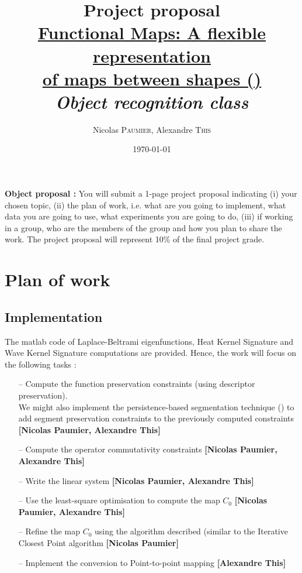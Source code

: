 \documentclass{article}
\title{Project proposal \\ \underline{Functional Maps: A flexible representation }\\ \underline{of maps between shapes (\cite{ovsjanikov2012functional})}\\ \textit{Object recognition class}} %
\author{Nicolas \textsc{Paumier}, Alexandre \textsc{This}} %
\date{\today} %
\begin{document}
\maketitle %



\setlength\parindent{0pt} %

\renewcommand{\labelenumi}{\alph{enumi}.} %

\vspace{3cm}
\textbf{Object proposal : } You will submit a 1-page project proposal indicating (i) your chosen topic, (ii) the plan of work, i.e. what are you going to implement, what data you are going to use, what experiments you are going to do, (iii) if working in a group, who are the members of the group and how you plan to share the work. The project proposal will represent 10\% of the final project grade.

\tableofcontents

\newpage

\section{Plan of work}
\subsection{Implementation}
The matlab code of Laplace-Beltrami eigenfunctions, Heat Kernel Signature and Wave Kernel Signature computations are provided. Hence, the work will focus on the following tasks :

\begin{itemize}
\item[--]{Compute the function preservation constraints (using descriptor preservation). \\We might also implement the persistence-based segmentation technique (\cite{skraba2010persistence}) to add segment preservation constraints to the previously computed constraints \textbf{[Nicolas Paumier, Alexandre This]}}
\item[--]{Compute the operator commutativity constraints \textbf{[Nicolas Paumier, Alexandre This]}}
\item[--]{Write the linear system \textbf{[Nicolas Paumier, Alexandre This]}}
\item[--]{Use the least-square optimisation to compute the map $C_{0}$ \textbf{[Nicolas Paumier, Alexandre This]}}
\item[--]{Refine the map $C_{0}$ using the algorithm described (similar to the Iterative Closest Point algorithm \textbf{[Nicolas Paumier]}}
\item[--]{Implement the conversion to Point-to-point mapping \textbf{[Alexandre This]}}
\end{itemize}
\end{document}
